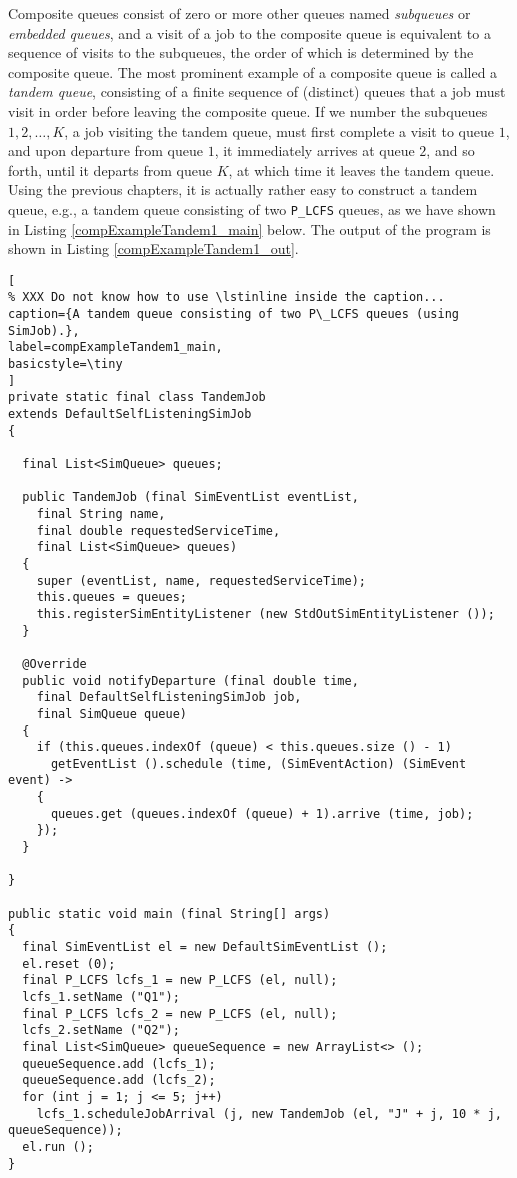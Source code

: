 \documentclass[12pt]{book}
\begin{document}
Composite queues consist of zero or more other queues
  named {\em subqueues\/} or {\em embedded queues},
  and a visit of a job to the composite queue is
  equivalent to a sequence of visits to the subqueues,
  the order of which is determined by the composite queue.
The most prominent example of a composite queue is called a {\em tandem queue\/},
  consisting of a finite sequence of (distinct) queues that a job must visit
  in order before leaving the composite queue.
If we number the subqueues $1, 2, \ldots, K$,
  a job visiting the tandem queue, must first complete
  a visit to queue $1$, and upon departure from queue $1$,
  it immediately arrives at queue $2$, and so forth,
  until it departs from queue $K$,
  at which time it leaves the tandem queue.
Using the previous chapters,
  it is actually rather easy to construct a tandem queue,
  e.g., a tandem queue consisting of two \lstinline|P_LCFS| queues,
  as we have shown in Listing \ref{compExampleTandem1_main} below.
The output of the program is shown in Listing \ref{compExampleTandem1_out}.

\begin{lstlisting}[
% XXX Do not know how to use \lstinline inside the caption...
caption={A tandem queue consisting of two P\_LCFS queues (using SimJob).},
label=compExampleTandem1_main,
basicstyle=\tiny
]
private static final class TandemJob
extends DefaultSelfListeningSimJob
{

  final List<SimQueue> queues;
    
  public TandemJob (final SimEventList eventList,
    final String name,
    final double requestedServiceTime,
    final List<SimQueue> queues)
  {
    super (eventList, name, requestedServiceTime);
    this.queues = queues;
    this.registerSimEntityListener (new StdOutSimEntityListener ());
  }

  @Override
  public void notifyDeparture (final double time,
    final DefaultSelfListeningSimJob job,
    final SimQueue queue)
  {
    if (this.queues.indexOf (queue) < this.queues.size () - 1)
      getEventList ().schedule (time, (SimEventAction) (SimEvent event) ->
    {
      queues.get (queues.indexOf (queue) + 1).arrive (time, job);
    });
  }

}
  
public static void main (final String[] args)
{    
  final SimEventList el = new DefaultSimEventList ();
  el.reset (0);
  final P_LCFS lcfs_1 = new P_LCFS (el, null);
  lcfs_1.setName ("Q1");
  final P_LCFS lcfs_2 = new P_LCFS (el, null);
  lcfs_2.setName ("Q2");
  final List<SimQueue> queueSequence = new ArrayList<> ();
  queueSequence.add (lcfs_1);
  queueSequence.add (lcfs_2);
  for (int j = 1; j <= 5; j++)
    lcfs_1.scheduleJobArrival (j, new TandemJob (el, "J" + j, 10 * j, queueSequence));
  el.run ();
}
\end{lstlisting}
\end{document}
